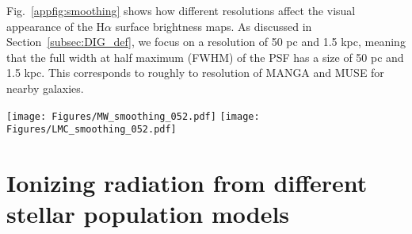\documentclass[fleqn,usenatbib]{mnras}
\begin{document}
Fig.~\ref{appfig:smoothing} shows how different resolutions affect the visual appearance of the H$\alpha$ surface brightness maps. As discussed in Section~\ref{subsec:DIG_def}, we focus on a resolution of 50 pc and 1.5 kpc, meaning that the full width at half maximum (FWHM) of the PSF has a size of 50 pc and 1.5 kpc. This corresponds to roughly to resolution of MANGA and MUSE for nearby galaxies.


\begin{figure*}
\texttt{[image: Figures/MW\_smoothing\_052.pdf]}
\hspace{0.05\linewidth}
\texttt{[image: Figures/LMC\_smoothing\_052.pdf]}
\caption{Effect of smoothing. We plot from left to right the H$\alpha$ surface brightness maps of the MW with a PSF full width at half maximum (FWHM) of 50 pc, the MW with PSF FWHM of 1.5 kpc, the LMC-BC03 with PSF FWHM of 50 pc, and the LMC-BC03 with PSF FWHM of 1.5 kpc. The top panels show the face-on projections, while the bottom panels show the edge-on projections.}
\label{appfig:smoothing}
\end{figure*}



\section{Ionizing radiation from different stellar population models}
\label{appsec:stellar_pop}
\end{document}
